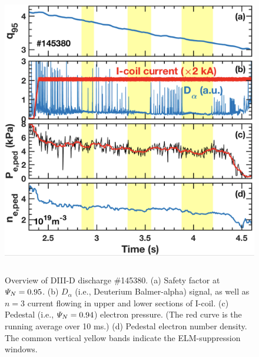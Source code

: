 \documentclass[12pt,prb,aps]{revtex4-1}
\begin{document}
\newpage

\begin{figure}
\includegraphics[height=5in]{fig1.pdf}
\caption{Overview of DIII-D discharge \#145380.
(a) Safety factor at  ${\mit\Psi}_N=0.95$. 
(b) $D_\alpha$ (i.e., Deuterium Balmer-alpha) signal, as well as $n=3$ current flowing in upper and lower sections of I-coil. 
(c) Pedestal (i.e., ${\mit\Psi}_N=0.94$)
electron pressure. (The red curve is the running average over 10 ms.) (d) Pedestal electron number density. The common vertical yellow bands indicate the ELM-suppression windows.}\label{fig1}
\end{figure}
\end{document}
